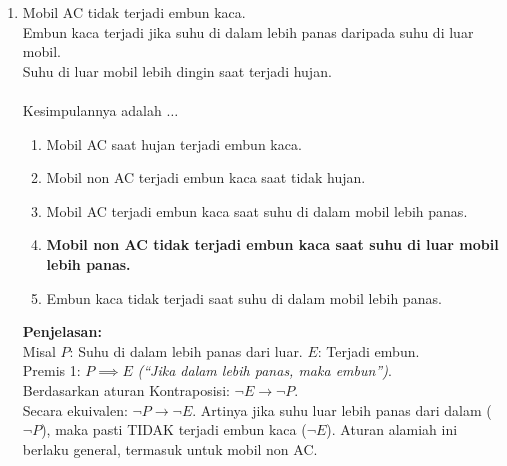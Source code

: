 \begin{multicols}{2}
\begin{enumerate}
    Kesimpulannya adalah $\dots$
    \begin{enumerate}
    \item Hujan menyebabkan sampah dan pohon berbuah.
    \item Hujan disebabkan sampah atau selokan kecil.
    \item \textbf{Banjir terjadi karena hujan atau sampah.}
    \item Banjir membuat pohon berbuah.
    \item Hujan membuat tanah subur dan banjir.
    \end{enumerate}
    \textbf{Penjelasan: } \\
    Misal $H$: Hujan, $B$: Banjir, $M$: Sampah. \\
    Premis 1: $H \implies (B \lor \dots)$ \textit{(``Hujan adalah salah satu sebab Banjir'')}. \\
    Premis 2: $(M \land \dots) \implies B$ \textit{(``Sampah adalah sebab lain dari Banjir'')}. \\
    Berdasarkan relasi kausalitas, kejadian Banjir ($B$) dapat terjadi akibat dipicu oleh Hujan ($H$) ATAU sampah ($M$). Secara logika: $B \impliedby (H \lor M)$.
  \item Mobil AC tidak terjadi embun kaca. \\
    Embun kaca terjadi jika suhu di dalam lebih panas daripada suhu di luar mobil. \\
    Suhu di luar mobil lebih dingin saat terjadi hujan. \\ \\
    Kesimpulannya adalah $\dots$
    \begin{enumerate}
    \item Mobil AC saat hujan terjadi embun kaca.
    \item Mobil non AC terjadi embun kaca saat tidak hujan.
    \item Mobil AC terjadi embun kaca saat suhu di dalam mobil lebih panas.
    \item \textbf{Mobil non AC tidak terjadi embun kaca saat suhu di luar mobil lebih panas.}
    \item Embun kaca tidak terjadi saat suhu di dalam mobil lebih panas.
    \end{enumerate}
    \textbf{Penjelasan: } \\
    Misal $P$: Suhu di dalam lebih panas dari luar. $E$: Terjadi embun. \\
    Premis 1: $P \implies E$ \textit{(``Jika dalam lebih panas, maka embun'')}. \\
    Berdasarkan aturan Kontraposisi: $\neg E \rightarrow \neg P$. \\
    Secara ekuivalen: $\neg P \rightarrow \neg E$. Artinya jika suhu luar lebih panas dari dalam ($\neg P$), maka pasti TIDAK terjadi embun kaca ($\neg  E$). Aturan alamiah ini berlaku general, termasuk untuk mobil non AC.
  \end{enumerate}
\end{multicols}

